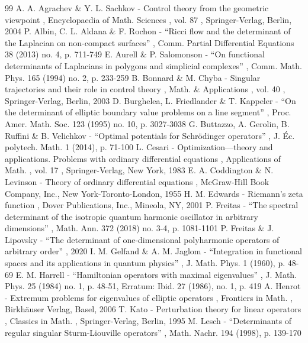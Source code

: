 \documentclass[11pt]{article}
\theoremstyle{plain}
\theoremstyle{definition}
\begin{document}

\begin{thebibliography}{99}
 A. A. Agrachev \& Y. L. Sachkov - Control theory from the geometric viewpoint , Encyclopaedia of Math. Sciences , vol. 87 , Springer-Verlag, Berlin, 2004
 P. Albin, C. L. Aldana \& F. Rochon - “Ricci flow and the determinant of the Laplacian on non-compact surfaces” , Comm. Partial Differential Equations 38 (2013) no. 4, p. 711-749
 E. Aurell \& P. Salomonson - “On functional determinants of Laplacians in polygons and simplicial complexes” , Comm. Math. Phys. 165 (1994) no. 2, p. 233-259
 B. Bonnard \& M. Chyba - Singular trajectories and their role in control theory , Math. \& Applications , vol. 40 , Springer-Verlag, Berlin, 2003
 D. Burghelea, L. Friedlander \& T. Kappeler - “On the determinant of elliptic boundary value problems on a line segment” , Proc. Amer. Math. Soc. 123 (1995) no. 10, p. 3027-3038
 G. Buttazzo, A. Gerolin, B. Ruffini \& B. Velichkov - “Optimal potentials for Schrödinger operators” , J. Éc. polytech. Math. 1 (2014), p. 71-100
 L. Cesari - Optimization—theory and applications. Problems with ordinary differential equations , Applications of Math. , vol. 17 , Springer-Verlag, New York, 1983
 E. A. Coddington \& N. Levinson - Theory of ordinary differential equations , McGraw-Hill Book Company, Inc., New York-Toronto-London, 1955
 H. M. Edwards - Riemann’s zeta function , Dover Publications, Inc., Mineola, NY, 2001
 P. Freitas - “The spectral determinant of the isotropic quantum harmonic oscillator in arbitrary dimensions” , Math. Ann. 372 (2018) no. 3-4, p. 1081-1101
 P. Freitas \& J. Lipovsky - “The determinant of one-dimensional polyharmonic operators of arbitrary order” , 2020
 I. M. Gelfand \& A. M. Jaglom - “Integration in functional spaces and its applications in quantum physics” , J. Math. Phys. 1 (1960), p. 48-69
 E. M. Harrell - “Hamiltonian operators with maximal eigenvalues” , J. Math. Phys. 25 (1984) no. 1, p. 48-51, Erratum: Ibid. 27 (1986), no. 1, p. 419
 A. Henrot - Extremum problems for eigenvalues of elliptic operators , Frontiers in Math. , Birkhäuser Verlag, Basel, 2006
 T. Kato - Perturbation theory for linear operators , Classics in Math. , Springer-Verlag, Berlin, 1995
 M. Lesch - “Determinants of regular singular Sturm-Liouville operators” , Math. Nachr. 194 (1998), p. 139-170

\end{thebibliography}
\end{document}
